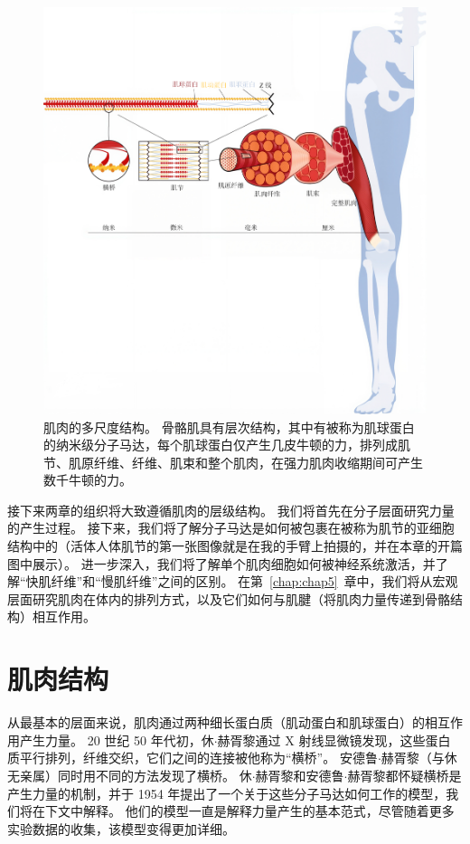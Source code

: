 \begin{figure}[!htb]
	\centering
	\includegraphics[width=1.0\linewidth]{chap4/4_2}
	\caption{肌肉的多尺度结构。
		骨骼肌具有层次结构，其中有被称为肌球蛋白的纳米级分子马达，每个肌球蛋白仅产生几皮牛顿的力，排列成肌节、肌原纤维、纤维、肌束和整个肌肉，在强力肌肉收缩期间可产生数千牛顿的力。 \label{fig:4_2}}
\end{figure}


接下来两章的组织将大致遵循肌肉的层级结构。
我们将首先在分子层面研究力量的产生过程。
接下来，我们将了解分子马达是如何被包裹在被称为肌节的亚细胞结构中的（活体人体肌节的第一张图像就是在我的手臂上拍摄的，并在本章的开篇图中展示）。
进一步深入，我们将了解单个肌肉细胞如何被神经系统激活，并了解“快肌纤维”和“慢肌纤维”之间的区别。
在第~\ref{chap:chap5}~章中，我们将从宏观层面研究肌肉在体内的排列方式，以及它们如何与肌腱（将肌肉力量传递到骨骼结构）相互作用。


\section{肌肉结构}

从最基本的层面来说，肌肉通过两种细长蛋白质（肌动蛋白和肌球蛋白）的相互作用产生力量。
20 世纪 50 年代初，休$\cdot$赫胥黎通过 X 射线显微镜发现，这些蛋白质平行排列，纤维交织，它们之间的连接被他称为“横桥”。
安德鲁$\cdot$赫胥黎（与休无亲属）同时用不同的方法发现了横桥。
休$\cdot$赫胥黎和安德鲁$\cdot$赫胥黎都怀疑横桥是产生力量的机制，并于 1954 年提出了一个关于这些分子马达如何工作的模型，我们将在下文中解释。
他们的模型一直是解释力量产生的基本范式，尽管随着更多实验数据的收集，该模型变得更加详细。


